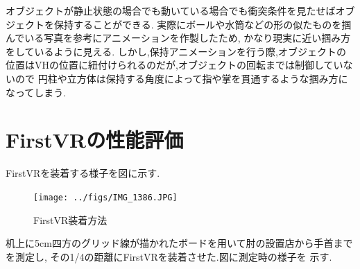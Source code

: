 \documentclass{ltjsreport}
\begin{document}
		オブジェクトが静止状態の場合でも動いている場合でも衝突条件を見たせばオブジェクトを保持することができる.
		実際にボールや水筒などの形の似たものを掴んでいる写真を参考にアニメーションを作製したため,
		かなり現実に近い掴み方をしているように見える.
		しかし,保持アニメーションを行う際,オブジェクトの位置はVHの位置に紐付けられるのだが,オブジェクトの回転までは制御していないので
		円柱や立方体は保持する角度によって指や掌を貫通するような掴み方になってしまう.

	\section{FirstVRの性能評価}
		FirstVRを装着する様子を図に示す.
		\begin{figure}[H]
		\centering
		\texttt{[image: ../figs/IMG\_1386.JPG]}
		\caption{FirstVR装着方法}
		\label{fig:FirsrVRfit}
		\end{figure}
		机上に5cm四方のグリッド線が描かれたボードを用いて肘の設置店から手首までを測定し,
		その1/4の距離にFirstVRを装着させた.図に測定時の様子を
		示す.
\end{document}
